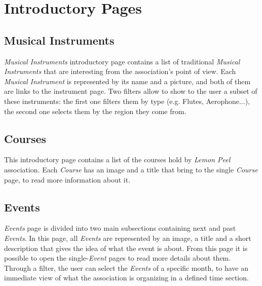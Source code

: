 \documentclass[../../DD.tex]{subfiles}
\begin{document}
\section{Introductory Pages \label{sect:2.1}}
	\subsection{Musical Instruments}
		\textit{Musical Instruments} introductory page contains a list of traditional \textit{Musical Instruments} that are interesting from the association's point of view. Each \textit{Musical Instrument} is represented by its name and a picture, and both of them are links to the instrument page. Two filters allow to show to the user a subset of these instruments: the first one filters them by type (e.g. Flutes, Aerophone...), the second one selects them by the region they come from.
		\newline

	\subsection{Courses}
		This introductory page contains a list of the courses hold by \textit{Lemon Peel} association. Each \textit{Course} has an image and a title that bring to the single \textit{Course} page, to read more information about it.
		\newline

	\subsection{Events}
		\textit{Events} page is divided into two main subsections containing next and past \textit{Events}. In this page, all \textit{Events} are represented by an image, a title and a short description that gives the idea of what the event is about. From this page it is possible to open the single-\textit{Event} pages to read more details about them. Through a filter, the user can select the \textit{Events} of a specific month, to have an immediate view of what the association is organizing in a defined time section.
		\newline

	
\end{document}
